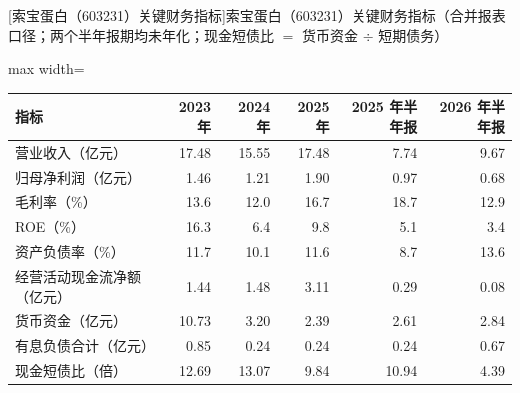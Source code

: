 \begin{center}\small\setlength{\tabcolsep}{3.4pt}
[索宝蛋白（603231）关键财务指标]{索宝蛋白（603231）关键财务指标（合并报表口径；两个半年报期均未年化；现金短债比 $=$ 货币资金 $\div$ 短期债务）}
\begin{adjustbox}{max width=\textwidth}
\begin{tabular}{@{}lrrrrr@{}}
\toprule
指标 & 2023 年 & 2024 年 & 2025 年 & 2025 年半年报 & 2026 年半年报 \\
\midrule
营业收入（亿元） & 17.48 & 15.55 & 17.48 & 7.74 & 9.67 \\
归母净利润（亿元） & 1.46 & 1.21 & 1.90 & 0.97 & 0.68 \\
毛利率（\%） & 13.6 & 12.0 & 16.7 & 18.7 & 12.9 \\
ROE（\%） & 16.3 & 6.4 & 9.8 & 5.1 & 3.4 \\
资产负债率（\%） & 11.7 & 10.1 & 11.6 & 8.7 & 13.6 \\
经营活动现金流净额（亿元） & 1.44 & 1.48 & 3.11 & 0.29 & 0.08 \\
货币资金（亿元） & 10.73 & 3.20 & 2.39 & 2.61 & 2.84 \\
有息负债合计（亿元） & 0.85 & 0.24 & 0.24 & 0.24 & 0.67 \\
现金短债比（倍） & 12.69 & 13.07 & 9.84 & 10.94 & 4.39 \\
\bottomrule
\end{tabular}
\end{adjustbox}
\end{center}

